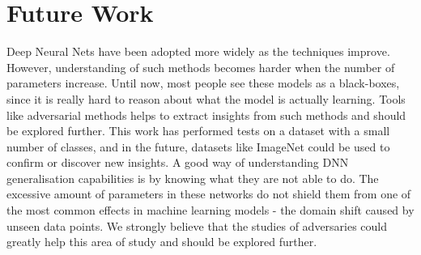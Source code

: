 \section{Future Work}

Deep Neural Nets have been adopted more widely as the techniques improve. However, understanding of such methods becomes harder when the number of parameters increase. Until now, most people see these models as a black-boxes, since it is really hard to reason about what the model is actually learning. Tools like adversarial methods helps to extract insights from such methods and should be explored further. This work has performed tests on a dataset with a small number of classes, and in the future, datasets like ImageNet could be used to confirm or discover new insights. A good way of understanding DNN generalisation capabilities is by knowing what they are not able to do. The excessive amount of parameters in these networks do not shield them from one of the most common effects in machine learning models - the domain shift caused by unseen data points. We strongly believe that the studies of adversaries could greatly help this area of study and should be explored further.